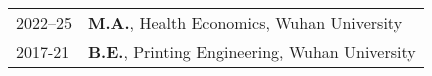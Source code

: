 

\renewcommand{\thefootnote}{\fnsymbol{footnote}}
\setcounter{footnote}{0}

\begin{longtable}[l]{@{}p{} p{}}
    2022--25\footnotemark & \textbf{M.A.}, Health Economics, Wuhan University \\

    2017-21 & \textbf{B.E.}, Printing Engineering, Wuhan University \\

\end{longtable}



\renewcommand{\thefootnote}{\arabic{footnote}}
\setcounter{footnote}{1}
